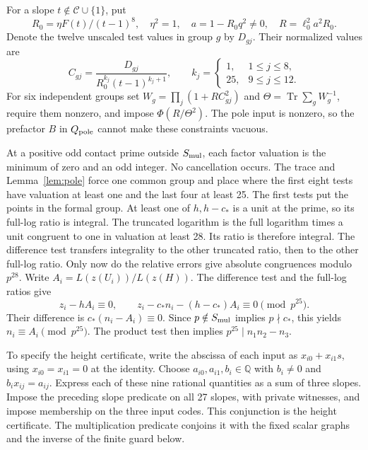 \documentclass[11pt]{article}
\theoremstyle{definition}
\theoremstyle{remark}
\newcommand{\Q}{\mathbb Q}
\newcommand{\Cset}{\mathcal C}
\newcommand{\Tr}{\operatorname{Tr}}
\begin{document}
For a slope $t\notin\Cset\cup\{1\}$, put
\[
 R_0=\eta F(t)/(t-1)^8,\quad\eta^2=1,\quad
 a=1-R_0q^2\ne0,\quad R=\ell_0^2a^2R_0.
\]
Denote the twelve unscaled test values in group $g$ by $D_{gj}$.
Their normalized values are
\[
 C_{gj}=\frac{D_{gj}}{R_0^{k_j}(t-1)^{k_j+1}},\qquad
 k_j=\begin{cases}1,&1\le j\le8,\\25,&9\le j\le12.\end{cases}
\]
For six independent groups set
$W_g=\prod_j(1+RC_{gj}^2)$ and
$\Theta=\Tr\sum_gW_g^{-1}$, require them nonzero, and impose
$\Phi(R/\Theta^2)$. The pole input is nonzero, so the prefactor $B$
in $Q_{\rm pole}$ cannot make these constraints vacuous.

At a positive odd contact prime outside $S_{\rm mul}$, each factor
valuation is the minimum of zero and an odd integer. No cancellation
occurs. The trace and Lemma~\ref{lem:pole} force one common group and
place where the first eight tests have valuation at least one and
the last four at least 25. The first tests put the points in the
formal group. At least one of $h,h-c_*$ is a unit at the prime, so its full-log
ratio is integral. The truncated logarithm is the full logarithm times
a unit congruent to one in valuation at least 28. Its ratio is therefore
integral. The difference test transfers integrality to the other truncated
ratio, then to the other full-log ratio. Only now do the relative errors
give absolute congruences modulo $p^{28}$. Write $A_i=L(z(U_i))/L(z(H))$. The difference test and the
full-log ratios give
\[
 z_i-hA_i\equiv0,\qquad
 z_i-c_*n_i-(h-c_*)A_i\equiv0\pmod{p^{25}}.
\]
Their difference is $c_*(n_i-A_i)\equiv0$.
Since $p\notin S_{\rm mul}$ implies $p\nmid c_*$, this yields
$n_i\equiv A_i\pmod{p^{25}}$.
The product test then implies $p^{25}\mid n_1n_2-n_3$.

To specify the height certificate, write the abscissa of each input as
$x_{i0}+x_{i1}s$, using $x_{i0}=x_{i1}=0$ at the identity. Choose
$a_{i0},a_{i1},b_i\in\Q$ with $b_i\ne0$ and
$b_i x_{ij}=a_{ij}$. Express each of these nine rational quantities
as a sum of three slopes. Impose the preceding slope predicate on
all 27 slopes, with private witnesses, and impose membership on the
three input codes. This conjunction is the height certificate.
The multiplication predicate conjoins it with the fixed scalar
graphs and the inverse of the finite guard below.
\end{document}
